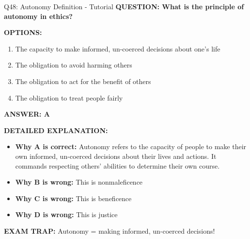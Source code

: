 \documentclass[8pt]{beamer}
\begin{document}
	\begin{frame}{Q48: Autonomy Definition - Tutorial}
		\fontsize{6.5}{7.5}\selectfont
		\textbf{QUESTION: What is the principle of autonomy in ethics?}
		
		\vspace{0.1cm}
		\textbf{OPTIONS:}
		\begin{enumerate}
			\item The capacity to make informed, un-coerced decisions about one's life
			\item The obligation to avoid harming others
			\item The obligation to act for the benefit of others
			\item The obligation to treat people fairly
		\end{enumerate}
		
		\vspace{0.1cm}
		\textcolor{myblue}{\textbf{ANSWER: A}}
		
		\vspace{0.1cm}
		\textbf{DETAILED EXPLANATION:}
		\begin{itemize}
			\item \textbf{Why A is correct:} Autonomy refers to the capacity of people to make their own informed, un-coerced decisions about their lives and actions. It commands respecting others' abilities to determine their own course.
			\item \textbf{Why B is wrong:} This is nonmaleficence
			\item \textbf{Why C is wrong:} This is beneficence
			\item \textbf{Why D is wrong:} This is justice
		\end{itemize}
		
		\textcolor{myred}{\textbf{EXAM TRAP:}} Autonomy = \textcolor{myblue}{making informed, un-coerced decisions}!
	\end{frame}
	
\end{document}
